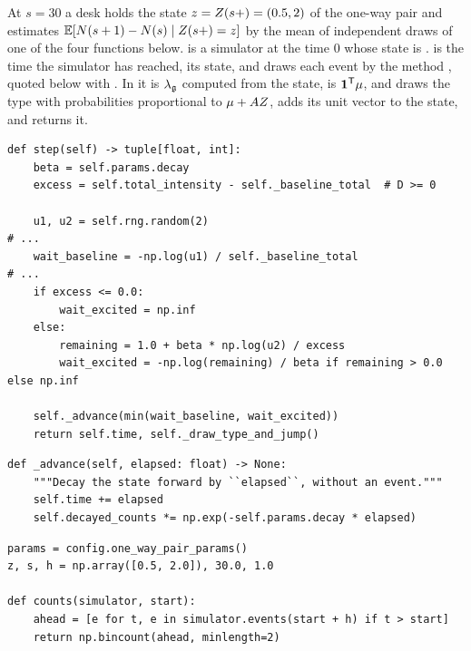 \begin{question}
\label{question.fanStartsTheClockAtZero}
At $s = 30$ a desk holds the state $z = Z(s+) = (0.5, 2)$ of the one-way pair
and estimates
$\mathbb{E}[N(s+1) - N(s) \mid Z(s+) = z]$
by the mean of independent draws of one of the four functions below.
 is a simulator at the time 0 whose state is .
 is the time the simulator has reached,
 its state,
and  draws each event by the method , quoted below with .
In it  is $\lambda_{\mathfrak{g}}$ computed from the state,
 is $\mathbf{1}^{\mathsf{T}}\mu$,
and  draws the type
with probabilities proportional to $\mu + AZ$,
adds its unit vector to the state, and returns it.
\begin{lstlisting}[caption={\protect\codehl{unito26.lob.hawkes.ExponentialHawkes.step}, abridged.}, label=listing.fanStartsTheClockAtZeroStep]
def step(self) -> tuple[float, int]:
    beta = self.params.decay
    excess = self.total_intensity - self._baseline_total  # D >= 0

    u1, u2 = self.rng.random(2)
# ...
    wait_baseline = -np.log(u1) / self._baseline_total
# ...
    if excess <= 0.0:
        wait_excited = np.inf
    else:
        remaining = 1.0 + beta * np.log(u2) / excess
        wait_excited = -np.log(remaining) / beta if remaining > 0.0 else np.inf

    self._advance(min(wait_baseline, wait_excited))
    return self.time, self._draw_type_and_jump()
\end{lstlisting}
\begin{lstlisting}[caption={\protect\codehl{unito26.lob.hawkes.\_HawkesState.\_advance}}, label=listing.fanStartsTheClockAtZeroAdvance]
def _advance(self, elapsed: float) -> None:
    """Decay the state forward by ``elapsed``, without an event."""
    self.time += elapsed
    self.decayed_counts *= np.exp(-self.params.decay * elapsed)
\end{lstlisting}
\begin{lstlisting}[caption={Four estimates of the expected counts after $s$}, label=listing.fanStartsTheClockAtZeroEstimates]
params = config.one_way_pair_params()
z, s, h = np.array([0.5, 2.0]), 30.0, 1.0

def counts(simulator, start):
    ahead = [e for t, e in simulator.events(start + h) if t > start]
    return np.bincount(ahead, minlength=2)


\end{lstlisting}
\end{question}
